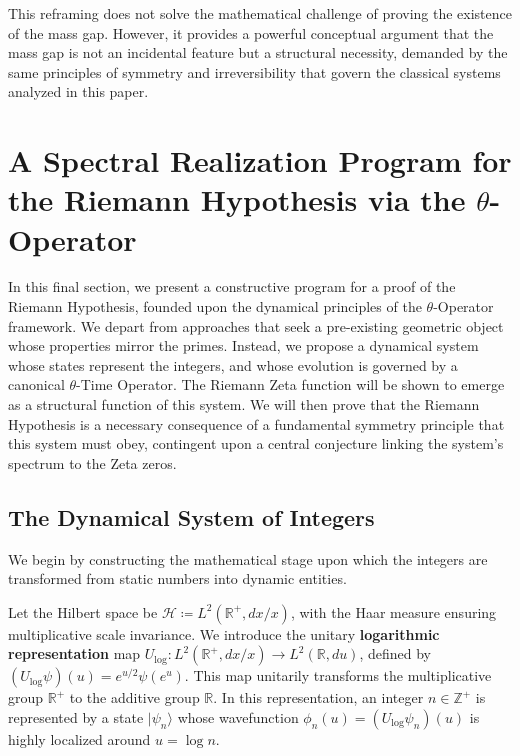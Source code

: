 This reframing does not solve the mathematical challenge of proving the existence of the mass gap. However, it provides a powerful conceptual argument that the mass gap is not an incidental feature but a structural necessity, demanded by the same principles of symmetry and irreversibility that govern the classical systems analyzed in this paper.



\section{A Spectral Realization Program for the Riemann Hypothesis via the $\theta$-Operator}
\label{sec:theta_operator_rh_program}

In this final section, we present a constructive program for a proof of the Riemann Hypothesis, founded upon the dynamical principles of the $\theta$-Operator framework. We depart from approaches that seek a pre-existing geometric object whose properties mirror the primes. Instead, we propose a dynamical system whose states represent the integers, and whose evolution is governed by a canonical $\theta$-Time Operator. The Riemann Zeta function will be shown to emerge as a structural function of this system. We will then prove that the Riemann Hypothesis is a necessary consequence of a fundamental symmetry principle that this system must obey, contingent upon a central conjecture linking the system's spectrum to the Zeta zeros.

\subsection{The Dynamical System of Integers}
We begin by constructing the mathematical stage upon which the integers are transformed from static numbers into dynamic entities.

\begin{definition}
\label{def:hilbert_space_integers}
Let the Hilbert space be $\mathcal{H} \coloneqq L^2(\mathbb{R}^+, dx/x)$, with the Haar measure ensuring multiplicative scale invariance. We introduce the unitary \textbf{logarithmic representation} map $U_{\log}: L^2(\mathbb{R}^+, dx/x) \to L^2(\mathbb{R}, du)$, defined by $(U_{\log}\psi)(u) = e^{u/2}\psi(e^u)$. This map unitarily transforms the multiplicative group $\mathbb{R}^+$ to the additive group $\mathbb{R}$.
In this representation, an integer $n \in \mathbb{Z}^+$ is represented by a state $|\psi_n\rangle$ whose wavefunction $\phi_n(u) = (U_{\log}\psi_n)(u)$ is highly localized around $u = \log n$.
\end{definition}

